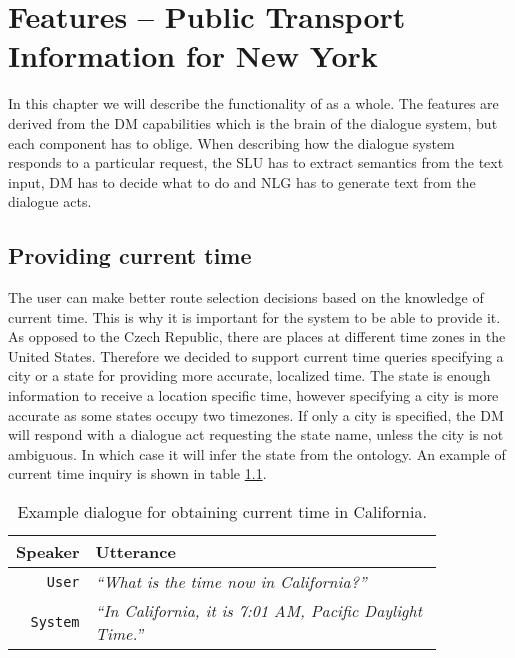 \chapter{Features -- Public Transport Information for New York}

In this chapter we will describe the functionality of  as a whole.
The features are derived from the DM capabilities which is the brain of the dialogue system, but each component has to oblige.
When describing how the dialogue system responds to a particular request, the SLU has to extract semantics from the text input, DM has to decide what to do and NLG has to generate text from the dialogue acts.

\section{Providing current time} \label{sec:time}

The user can make better route selection decisions based on the knowledge of current time.
This is why it is important for the system to be able to provide it.
As opposed to the Czech Republic, there are places at different time zones in the United States.
Therefore we decided to support current time queries specifying a city or a state for providing more accurate, localized time.
The state is enough information to receive a location specific time, however specifying a city is more accurate as some states occupy two timezones.
If only a city is specified, the DM will respond with a dialogue act requesting the state name, unless the city is not ambiguous.
In which case it will infer the state from the ontology.
An example of current time inquiry is shown in table \ref{table:time}.

\begin{table}[h]
\centering
\begin{tabular}{ | r | p{0.85\linewidth} | } \hline
	\textbf{Speaker} & \textbf{Utterance} \\ \hline
	\texttt{User} & \textit{``What is the time now in California?''} \\ \hline
	\texttt{System} & \textit{``In California, it is 7:01 AM, Pacific Daylight Time.''} \\ \hline
\end{tabular}
\caption[Current time in California]{Example dialogue for obtaining current time in California.}
\label{table:time}
\end{table}

